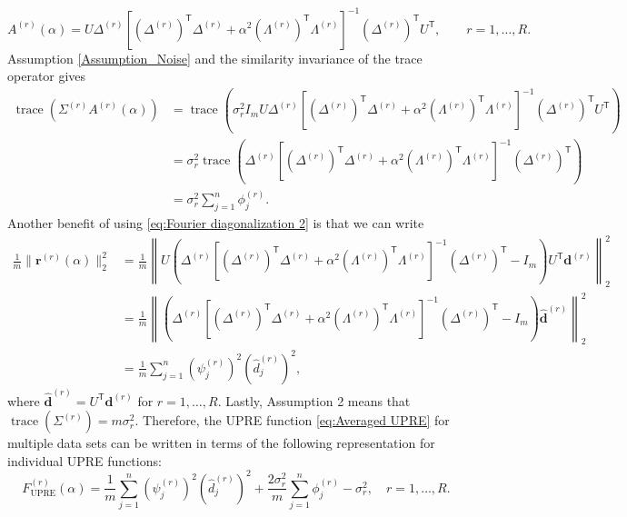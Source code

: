\documentclass[12pt]{article}
\newcommand{\mA}{m}	%
\newcommand{\dVec}{\mathbf{d}}	%
\newcommand{\rVec}{\mathbf{r}}	%
\newcommand{\trans}[1]{{#1}^\mathsf{T}}	%
\DeclareMathOperator{\trace}{trace}		%
\newcommand{\dft}[1]{\widehat{#1}}	%
\newcommand{\regparam}{\alpha}  %
\newcommand{\filt}{\phi}
\newcommand{\mfilt}{\psi}
\newcommand{\noiseSD}{\sigma}	%
\newcommand{\U}{F_{\text{UPRE}}}	%
\begin{document}
\begin{equation}
\label{eq:Fourier diagonalization 2}
A^{(r)}(\regparam) = U\Delta^{(r)}\left[\trans{(\Delta^{(r)})}\Delta^{(r)} + \regparam^2\trans{(\Lambda^{(r)})}\Lambda^{(r)}\right]^{-1}\trans{(\Delta^{(r)})}\trans{U}, \qquad r = 1,\ldots,R.
\end{equation}
Assumption \ref{Assumption_Noise} and the similarity invariance of the trace operator gives
\begin{align}
    \trace\left(\Sigma^{(r)}A^{(r)}(\regparam)\right) &=  \trace\left(\noiseSD_r^2 I_{m} U\Delta^{(r)}\left[\trans{(\Delta^{(r)})}\Delta^{(r)} + \regparam^2\trans{(\Lambda^{(r)})}\Lambda^{(r)}\right]^{-1}\trans{(\Delta^{(r)})}\trans{U}\right) \nonumber \\ 
    &= \noiseSD_r^2 \trace\left(\Delta^{(r)}\left[\trans{(\Delta^{(r)})}\Delta^{(r)} + \regparam^2\trans{(\Lambda^{(r)})}\Lambda^{(r)}\right]^{-1}\trans{(\Delta^{(r)})}\right) \nonumber \\
    &= \noiseSD_r^2 \sum_{j=1}^{n} \filt^{(r)}_j. \label{eq:Trace}
\end{align}
Another benefit of using \eqref{eq:Fourier diagonalization 2} is that we can write
\begin{align}
\frac{1}{\mA}\|\rVec^{(r)}(\regparam)\|_2^2 &= \frac{1}{\mA}\left\|U\left(\Delta^{(r)}\left[\trans{(\Delta^{(r)})}\Delta^{(r)} + \regparam^2\trans{(\Lambda^{(r)})}\Lambda^{(r)}\right]^{-1}\trans{(\Delta^{(r)})} - I_{\mA}\right)\trans{U}\dVec^{(r)}\right\|_2^2 \nonumber \\
&= \frac{1}{\mA}\left\|\left(\Delta^{(r)}\left[\trans{(\Delta^{(r)})}\Delta^{(r)} + \regparam^2\trans{(\Lambda^{(r)})}\Lambda^{(r)}\right]^{-1}\trans{(\Delta^{(r)})} - I_{\mA}\right)\dft{\dVec}^{(r)}\right\|_2^2 \nonumber \\
&= \frac{1}{\mA}\sum_{j=1}^{n} \left(\mfilt^{(r)}_j\right)^2\left(\dft{d}_j^{(r)}\right)^2,
\label{eq:Fourier regularized residual}
\end{align}
where $\dft{\dVec}^{(r)} = \trans{U}\dVec^{(r)}$ for $r = 1,\ldots,R$. Lastly, Assumption 2 means that $\trace(\Sigma^{(r)}) = m\noiseSD^2_r$. Therefore, the UPRE function \eqref{eq:Averaged UPRE} for multiple data sets can be written in terms of the following representation for individual UPRE functions:
\begin{equation}
\label{eq:Individual UPRE 2}
\U^{(r)}(\regparam) = \frac{1}{\mA} \sum_{j=1}^{n} \left(\mfilt^{(r)}_j\right)^2\left(\dft{d}_j^{(r)}\right)^2 + \frac{2\noiseSD^2_r}{\mA} \sum_{j=1}^{n} \filt^{(r)}_j - \noiseSD^2_r, \quad r = 1,\ldots,R.
\end{equation}
\end{document}
